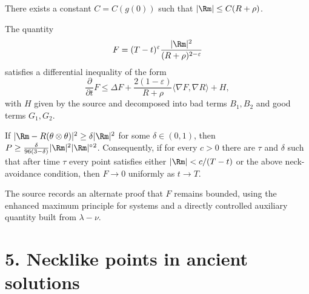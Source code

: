 \begin{lemma}
\label{ch09-lem-curvature-vs-scalar}
There exists a constant \(C=C(g(0))\) such that \(|\Rm|\le C(R+\rho)\).
\end{lemma}

\begin{lemma}
\label{ch09-lem-modified-pinching-evolution}
The quantity
\[
F=(T-t)^\varepsilon \frac{|\Rm|^2}{(R+\rho)^{2-\varepsilon}}
\]
satisfies a differential inequality of the form
\[
\frac{\partial}{\partial t}F\le \Delta F+\frac{2(1-\varepsilon)}{R+\rho}\langle \nabla F,\nabla R\rangle+H,
\]
with \(H\) given by the source and decomposed into bad terms \(B_1,B_2\) and good terms \(G_1,G_2\).
\end{lemma}

\begin{lemma}
\label{ch09-lem-pinching-improves-away-from-necks}
If \(|\Rm-R(\theta\otimes\theta)|^2\ge \delta |\Rm|^2\) for some \(\delta\in(0,1)\), then \(P\ge \frac{\delta}{96(3-\delta)}|\Rm|^2|\Rm|^{\circ}{}^2\). Consequently, if for every \(c>0\) there are \(\tau\) and \(\delta\) such that after time \(\tau\) every point satisfies either \(|\Rm|<c/(T-t)\) or the above neck-avoidance condition, then \(F\to 0\) uniformly as \(t\to T\).
\end{lemma}

\begin{remark}
\label{ch09-rem-alternate-boundedness-of-F}
The source records an alternate proof that \(F\) remains bounded, using the enhanced maximum principle for systems and a directly controlled auxiliary quantity built from \(\lambda-\nu\).
\end{remark}

\section*{5. Necklike points in ancient solutions}

